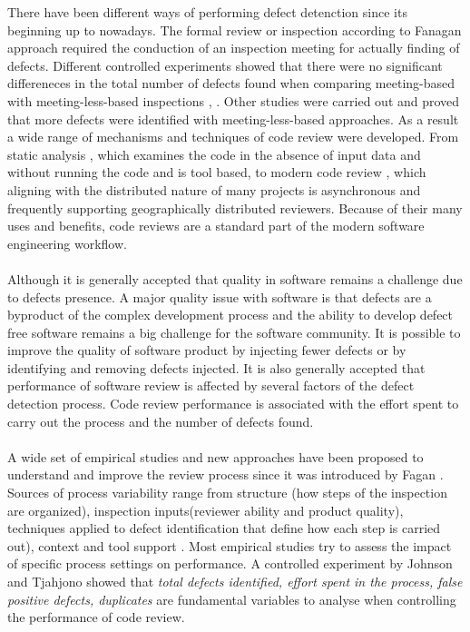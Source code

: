 \documentclass[ifip]{svmult}
\begin{document}
There have been different ways of performing defect detenction since its beginning up to nowadays. The formal review or inspection 
according to Fanagan \cite{contribution15} approach required the conduction of an inspection meeting for actually finding of 
defects. Different controlled experiments showed that there were no significant differeneces in the total number of defects found 
when comparing meeting-based with meeting-less-based inspections \cite{contribution17}, \cite{contribution18}. Other 
studies \cite{contribution19} were carried out and proved that more defects were identified with meeting-less-based approaches. 
As a result a wide range of mechanisms and techniques of code review were developed. From static analysis 
\cite{contribution3} \cite{contribution4} \cite{contribution5}, which examines the code in 
the absence of input data and without running the code and is tool based, to modern code review 
\cite{contribution6} \cite{contribution7} \cite{contribution8}, which aligning with the distributed 
nature of many projects is asynchronous and frequently supporting geographically distributed reviewers. Because of their many uses 
and benefits, code reviews are a standard part of the modern software engineering workflow.
\\ \\
Although it is generally accepted that quality in software remains a challenge due to defects presence. A major quality issue with 
software is that defects are a byproduct of the complex development process and the ability to develop defect free software 
remains a big challenge for the software community. 
It is possible to improve the quality of software product by injecting fewer defects or by identifying and 
removing defects injected. It is also generally accepted that performance of software review is affected by several factors of the 
defect detection process. Code review performance is associated with the effort spent to carry out the process and the number of 
defects found. 
\\ \\A wide set of empirical studies and new approaches have been proposed to understand and improve the review process since it 
was introduced by Fagan \cite{contribution15}. Sources of process variability range from structure (how steps of the inspection 
are organized), inspection inputs(reviewer ability and product quality), 
techniques applied to defect identification that define how each step is carried out), 
context and tool support \cite{contribution16}. Most empirical studies try to assess the impact of specific process settings on performance. 
A controlled experiment by Johnson and Tjahjono \cite{contribution17} showed that \textit{total defects identified, effort spent in the 
process, false positive defects, duplicates} are fundamental variables to analyse when controlling the performance of code review. 
\end{document}
